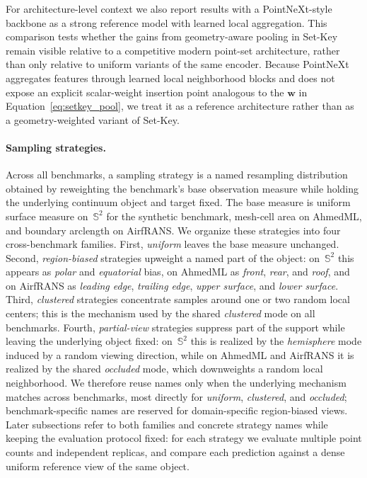\documentclass[11pt]{article}
\begin{document}
For architecture-level context we also report results with a
PointNeXt-style~\cite{qian2022pointnext} backbone as a strong reference model
with learned local aggregation.  This comparison tests whether the gains from
geometry-aware pooling in Set-Key remain visible relative to a competitive
modern point-set architecture, rather than only relative to uniform variants of
the same encoder.  Because PointNeXt aggregates features through learned local
neighborhood blocks and does not expose an explicit scalar-weight insertion
point analogous to the $\boldsymbol{w}$ in Equation~\eqref{eq:setkey_pool}, we
treat it as a reference architecture rather than as a geometry-weighted variant
of Set-Key.

\paragraph{Sampling strategies.}
Across all benchmarks, a sampling strategy is a named resampling distribution
obtained by reweighting the benchmark's base observation measure while holding
the underlying continuum object and target fixed.  The base measure is uniform
surface measure on~$\mathbb{S}^2$ for the synthetic benchmark, mesh-cell area
on AhmedML, and boundary arclength on AirfRANS.  We organize these strategies
into four cross-benchmark families.  First, \emph{uniform} leaves the base
measure unchanged.  Second, \emph{region-biased} strategies upweight a named
part of the object: on~$\mathbb{S}^2$ this appears as \emph{polar} and
\emph{equatorial} bias, on AhmedML as \emph{front}, \emph{rear}, and
\emph{roof}, and on AirfRANS as \emph{leading edge}, \emph{trailing edge},
\emph{upper surface}, and \emph{lower surface}.  Third, \emph{clustered}
strategies concentrate samples around one or two random local centers; this is
the mechanism used by the shared \emph{clustered} mode on all benchmarks.
Fourth, \emph{partial-view} strategies suppress part of the support while
leaving the underlying object fixed: on~$\mathbb{S}^2$ this is realized by the
\emph{hemisphere} mode induced by a random viewing direction, while on AhmedML
and AirfRANS it is realized by the shared \emph{occluded} mode, which
downweights a random local neighborhood.  We therefore reuse names only when
the underlying mechanism matches across benchmarks, most directly for
\emph{uniform}, \emph{clustered}, and \emph{occluded}; benchmark-specific
names are reserved for domain-specific region-biased views.  Later subsections
refer to both families and concrete strategy names while keeping the
evaluation protocol fixed: for each strategy we evaluate multiple point counts
and independent replicas, and compare each prediction against a dense uniform
reference view of the same object.
\end{document}
